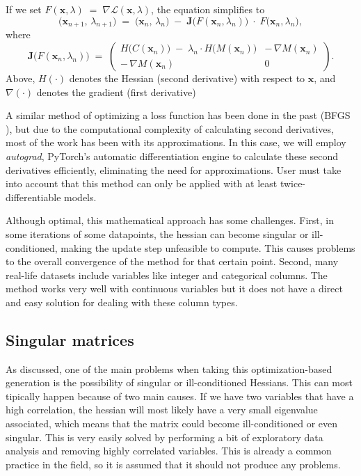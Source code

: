 \documentclass[12pt]{extarticle}
\numberwithin{equation}{section}
\begin{document}
If we set $F(\mathbf{x},\lambda) \;=\;\nabla \mathcal{L}(\mathbf{x},\lambda)$, 
the equation simplifies to
\begin{equation}\label{eq:newton_simplified}
\bigl(\mathbf{x}_{n+1},\,\lambda_{n+1}\bigr)
\;=\;
\bigl(\mathbf{x}_n,\,\lambda_n\bigr)
\;-\;
\mathbf{J}\!\bigl(F(\mathbf{x}_n,\lambda_n)\bigr)
\;\cdot\;
F\!\bigl(\mathbf{x}_n,\lambda_n\bigr),
\end{equation}
where
\begin{equation}\label{eq:hessian}
\mathbf{J}\!\bigl(F(\mathbf{x}_n,\lambda_n)\bigr)
\;=\;
\begin{pmatrix}
H\!\bigl(C(\mathbf{x}_n)\bigr)\;-\;\lambda_n \cdot H\!\bigl(M(\mathbf{x}_n)\bigr) 
    & -\,\nabla M(\mathbf{x}_n)
\\[6pt]
-\,\nabla M(\mathbf{x}_n)
    & 0
\end{pmatrix}.
\end{equation}
Above, $H(\cdot)$ denotes the Hessian (second derivative) with respect to $\mathbf{x}$, 
and $\nabla(\cdot)$ denotes the gradient (first derivative)

A similar method of optimizing a loss function has been done in the past (BFGS \cite{papakonstantinou2009historical}), 
but due to the computational complexity of calculating second derivatives, most of the work has been with its approximations. In this case, we will employ \emph{autograd}, PyTorch's automatic differentiation engine to calculate these second derivatives efficiently, eliminating the need for approximations. User must take into account that this method can only be applied with at least twice-differentiable models.

Although optimal, this mathematical approach has some challenges. First, in some iterations of some datapoints, the hessian can become singular or ill-conditioned, making the update step unfeasible to compute. This causes problems to the overall convergence of the method for that certain point. 
Second, many real-life datasets include variables like integer and categorical columns. The method works very well with continuous variables but it does not have a direct and easy solution for dealing with these column types.

\subsection{Singular matrices}\label{sec:singular}
As discussed, one of the main problems when taking this optimization-based generation is the possibility of singular or ill-conditioned Hessians. This can most tipically happen because of two main causes. If we have two variables that have a high correlation, the hessian  will most likely have a very small eigenvalue associated, which means that the matrix could become ill-conditioned or even singular. This is very easily solved by performing a bit of exploratory data analysis and removing highly correlated variables. This is already a common practice in the field, so it is assumed that it should not produce any problems.
\end{document}
